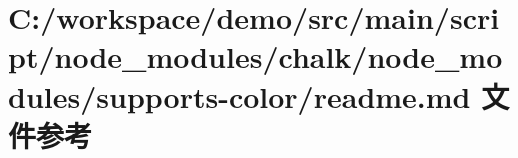 \hypertarget{node__modules_2chalk_2node__modules_2supports-color_2_r_e_a_d_m_e_8md}{}\section{C\+:/workspace/demo/src/main/script/node\+\_\+modules/chalk/node\+\_\+modules/supports-\/color/readme.md 文件参考}
\label{node__modules_2chalk_2node__modules_2supports-color_2_r_e_a_d_m_e_8md}
